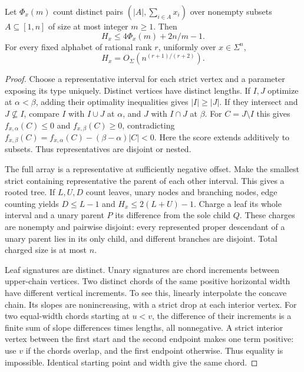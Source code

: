 \begin{lemma}\label{A-lem:rank}
Let $\Phi_x(m)$ count distinct pairs $(|A|,\sum_{i\in A}x_i)$ over nonempty subsets $A\subseteq[1,n]$ of size at most integer $m\ge1$. Then
\begin{equation}\label{A-eq:budget}
H_x\le4\Phi_x(m)+2n/m-1.
\end{equation}
For every fixed alphabet of rational rank $r$, uniformly over $x\in\Sigma^n$,
\begin{equation}\label{A-eq:rank}
H_x=O_\Sigma(n^{(r+1)/(r+2)}).
\end{equation}
\end{lemma}
\begin{proof}
Choose a representative interval for each strict vertex and a parameter exposing its type uniquely. Distinct vertices have distinct lengths. If $I,J$ optimize at $\alpha<\beta$, adding their optimality inequalities gives $|I|\ge|J|$. If they intersect and $J\not\subseteq I$, compare $I$ with $I\cup J$ at $\alpha$, and $J$ with $I\cap J$ at $\beta$. For $C=J\setminus I$ this gives $f_{x,\alpha}(C)\le0$ and $f_{x,\beta}(C)\ge0$, contradicting $f_{x,\beta}(C)=f_{x,\alpha}(C)-(\beta-\alpha)|C|<0$. Here the score extends additively to subsets. Thus representatives are disjoint or nested.

The full array is a representative at sufficiently negative offset. Make the smallest strict containing representative the parent of each other interval. This gives a rooted tree. If $L,U,D$ count leaves, unary nodes and branching nodes, edge counting yields $D\le L-1$ and $H_x\le2(L+U)-1$. Charge a leaf its whole interval and a unary parent $P$ its difference from the sole child $Q$. These charges are nonempty and pairwise disjoint: every represented proper descendant of a unary parent lies in its only child, and different branches are disjoint. Total charged size is at most $n$.

Leaf signatures are distinct. Unary signatures are chord increments between upper-chain vertices. Two distinct chords of the same positive horizontal width have different vertical increments. To see this, linearly interpolate the concave chain. Its slopes are nonincreasing, with a strict drop at each interior vertex. For two equal-width chords starting at $u<v$, the difference of their increments is a finite sum of slope differences times lengths, all nonnegative. A strict interior vertex between the first start and the second endpoint makes one term positive: use $v$ if the chords overlap, and the first endpoint otherwise. Thus equality is impossible. Identical starting point and width give the same chord.


\end{proof}
